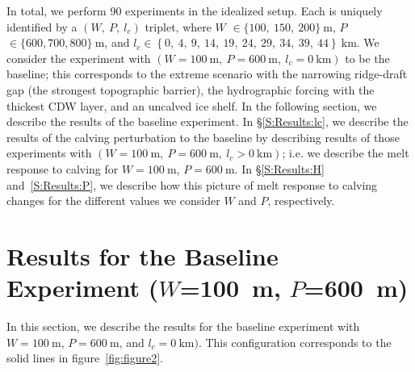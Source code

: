 \documentclass[draft]{agujournal2019}
\begin{document}
In total, we perform 90 experiments in the idealized setup. Each is uniquely identified by a $(W,~P,~l_c)$ triplet, where $W$ $\in \{100,~150,~200\}~\text{m}$, $P$ $\in \{600, 700, 800\}~\text{m}$, and $l_c \in \left\{0,~4,~9,~14,~19,~24,~29,~34,~39,~44\right\}~\text{km}$. We consider the experiment with $(W=100~\text{m},~P=600~\text{m},~l_c=0~\text{km}) $ to be the baseline; this corresponds to the extreme scenario with the narrowing ridge-draft gap (the strongest topographic barrier), the hydrographic forcing with the thickest CDW layer, and an uncalved ice shelf. In the following section, we describe the results of the baseline experiment. In \S\ref{S:Results:lc}, we describe the results of the calving perturbation to the baseline by describing results of those experiments with  $(W=100~\text{m},~P=600~\text{m},~l_c>0~\text{km})$; i.e. we describe the melt response to calving for $W=100~\text{m}$, $P = 600~\text{m}$. In \S\ref{S:Results:H} and~\ref{S:Results:P}, we describe how this picture of melt response to calving changes for the different values we consider $W$ and $P$, respectively.


\section{Results for the Baseline Experiment ($W$=100~m, $P$=600~m)}\label{S:Baseline}
In this section, we describe the results for the baseline experiment with $W=100~\text{m}$, $P=600~\text{m}$, and $l_c=0~\text{km})$. This configuration corresponds to the solid lines in figure~\ref{fig:figure2}.
\end{document}
